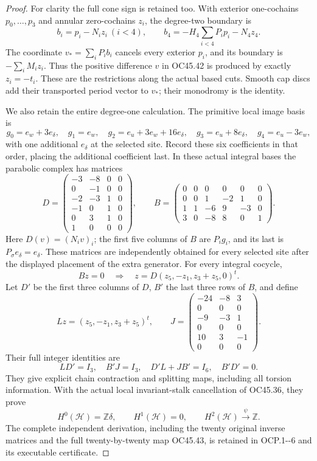 \begin{proof}
For clarity the full cone sign is retained too. With exterior
one-cochains \(p_0,\ldots,p_3\) and annular zero-cochains \(z_i\),
the degree-two boundary is
\[
 b_i=p_i-N_iz_i\ (i<4),\qquad
 b_4=-H_4\sum_{i<4}P_ip_i-N_4z_4.
 \tag{OC45.44}
\]
The coordinate \(v_*=\sum_iP_i b_i\) cancels every exterior
\(p_i\), and its boundary is \(-\sum_iM_i z_i\).
Thus the positive difference \(v\) in OC45.42 is produced
by exactly \(z_i=-t_i\). These are the restrictions along
the actual based cuts. Smooth cap discs add their transported
period vector to \(v_*\); their monodromy is the identity.

We also retain the entire degree-one calculation. The primitive
local image basis is
\[
 g_0=e_w+3e_\delta,\quad g_1=e_w,\quad
 g_2=e_u+3e_w+16e_\delta,\quad
 g_3=e_u+8e_\delta,\quad g_4=e_u-3e_w,
 \tag{OC45.45}
\]
with one additional \(e_\delta\) at the selected site.
Record these six coefficients in that order, placing the
additional coefficient last. In these actual integral bases
the parabolic complex has matrices
\[
 D=\begin{pmatrix}
 -3&-8&0&0\\0&-1&0&0\\-2&-3&1&0\\
 -1&0&1&0\\0&3&1&0\\1&0&0&0
 \end{pmatrix},\qquad
 B=\begin{pmatrix}
 0&0&0&0&0&0\\
 0&0&1&-2&1&0\\
 1&1&-6&9&-3&0\\
 3&0&-8&8&0&1
 \end{pmatrix}.
 \tag{OC45.46}
\]
Here \(D(v)=(N_iv)_i\); the first five columns of \(B\) are
\(P_i g_i\), and its last is \(P_\sigma e_\delta=e_\delta\).
These matrices are independently obtained for every selected
site after the displayed placement of the extra generator.
For every integral cocycle,
\[
 Bz=0\quad\Longrightarrow\quad
 z=D(z_5,-z_1,z_3+z_5,0)^t.
 \tag{OC45.47}
\]
Let \(D'\) be the first three columns of \(D\), \(B'\) the
last three rows of \(B\), and define
\[
 Lz=(z_5,-z_1,z_3+z_5)^t,\qquad
 J=\begin{pmatrix}
 -24&-8&3\\0&0&0\\-9&-3&1\\0&0&0\\
 10&3&-1\\0&0&0
 \end{pmatrix}.
 \tag{OC45.48}
\]
Their full integer identities are
\[
 LD'=I_3,\quad B'J=I_3,\quad D'L+JB'=I_6,\quad B'D'=0.
 \tag{OC45.49}
\]
They give explicit chain contraction and splitting maps,
including all torsion information. With the actual local
invariant-stalk cancellation of OC45.36, they prove
\[
 H^0(\mathscr H)=\mathbb Z\delta,\qquad
 H^1(\mathscr H)=0,\qquad
 H^2(\mathscr H)\xrightarrow{\ \psi\ }\mathbb Z.
 \tag{OC45.50}
\]
The complete independent derivation, including the twenty
original inverse matrices and the full twenty-by-twenty map
OC45.43, is retained in OCP.1-\/-6 and its executable certificate.


\end{proof}
